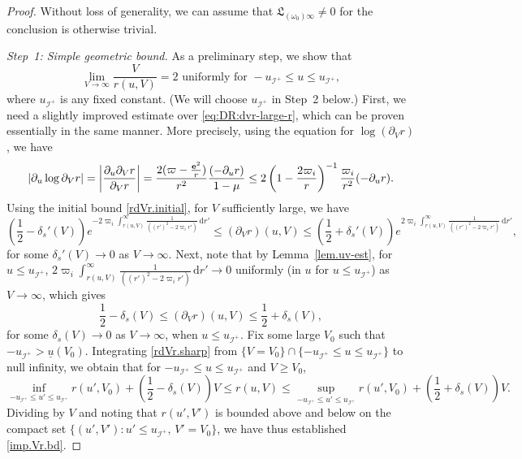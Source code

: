 \documentclass[10pt, reqno]{amsart}
\theoremstyle{definition}
\theoremstyle{remark}
\theoremstyle{conjecture}
\numberwithin{equation}{section}
\newcommand{\ud}{\mathrm{d}}
\newcommand{\rd}{\partial}
\newcommand{\0}{\emptyset}
\newcommand{\omg}{\omega}
\newcommand{\bfe}{{\bf e}}
\newcommand{\calI}{\mathcal I}
\newcommand{\f}{\frac}
\newcommand{\de}{\delta}
\newcommand{\pfstep}[1]{\vspace{.5em} {\it \noindent #1.}}
\newcommand{\e}{\bfe}							%
\newcommand{\NI}{\calI^{+}}						%
\newcommand{\ub}{\underline{u}}
\begin{document}
\begin{proof}
Without loss of generality, we can assume that $\mathfrak L_{(\omg_0)\infty}\neq 0$ for the conclusion is otherwise trivial.

\pfstep{Step~1: Simple geometric bound} As a preliminary step, we show that 
\begin{equation}\label{imp.Vr.bd}
\lim_{V\to\infty} \f{V}{r(u,V)}=2 \mbox{ uniformly for } -u_{\calI^+}\leq u\leq u_{\calI^+},
\end{equation}
where $u_{\calI^+}$ is any fixed constant. (We will choose $u_{\calI^+}$ in Step~2 below.) First, we need a slightly improved estimate over \eqref{eq:DR:dvr-large-r}, which can be proven essentially in the same manner. More precisely, using the equation for $\log (\rd_V r)$, we have
\begin{equation*}
	\left|\rd_{u} \log \rd_{V} r \right|= \left|\frac{\rd_{u} \rd_{V} r}{\rd_{V} r} \right|= \frac{2 (\varpi - \frac{\e^{2}}{r})}{r^{2}} \frac{(-\rd_{u} r)}{1-\mu}\leq 2 \left(1-\f{2\varpi_i}{r}\right)^{-1} \frac{\varpi_{i}}{r^{2}} (-\rd_{u} r).
\end{equation*}
Using the initial bound \eqref{rdVr.initial}, for $V$ sufficiently large, we have
\begin{equation*}
\left(\f 12 -\de_s'(V)\right)e^{-2\varpi_i\int^\infty_{r(u,V)} \f{1}{((r')^2-2\varpi_i r')}\, \ud r'}\leq  (\rd_V r)(u,V)\leq \left(\f 12 +\de_s'(V)\right)e^{2\varpi_i\int^\infty_{r(u,V)} \f{1}{((r')^2-2\varpi_i r')}\, \ud r'},
\end{equation*}
for some $\de_s'(V)\to 0$ as $V\to \infty$. Next, note that by Lemma~\ref{lem.uv-est}, for $u\leq u_{\calI^+}$, $2\varpi_i\int^\infty_{r(u,V)} \f{1}{((r')^2-2\varpi_i r')}\, \ud r'\to 0$ uniformly (in $u$ for $u\leq u_{\NI}$) as $V\to \infty$, which gives
\begin{equation}\label{rdVr.sharp}
\f 12 -\de_s(V)\leq  (\rd_V r)(u,V)\leq \f 12 + \de_s(V),
\end{equation}
for some $\de_s(V)\to 0$ as $V\to \infty$, when $u\leq u_{\calI^+}$. Fix some large $V_0$ such that $-u_{\calI^+}>\ub(V_0)$. Integrating \eqref{rdVr.sharp} from $\{V=V_0\}\cap\{-u_{\calI^+}\leq u\leq u_{\calI^+}\}$ to null infinity, we obtain that for $-u_{\calI^+}\leq u\leq u_{\calI^+}$ and $V\geq V_0$,
$$\inf_{-u_{\calI^+}\leq u'\leq u_{\calI^+}}r(u',V_0)+\left(\f 12-\de_s(V)\right)V\leq  r(u,V)\leq \sup_{-u_{\calI^+}\leq u'\leq u_{\calI^+}}r(u',V_0)+\left(\f 12+\de_s(V)\right)V. $$
Dividing by $V$ and noting that $r(u', V')$ is bounded above and below on the compact set $\{(u',V'):u'\leq u_{\calI^+},\, V'=V_0\}$, we have thus established \eqref{imp.Vr.bd}.


\end{proof}
\end{document}
